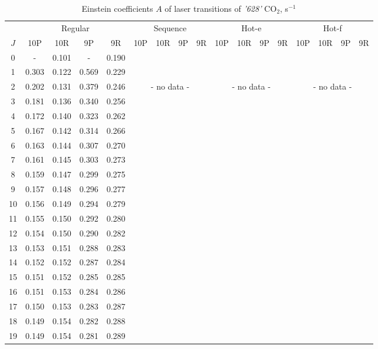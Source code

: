 \documentclass{report}
\begin{document}
\begin{table}
\centering
\caption{Einstein coefficients $A$ of laser transitions of \textit{'628'} CO$_2$, s$^{-1}$}
\scriptsize
\begin{tabular}{|c|cccc|cccc|cccc|cccc|}
\hline
& \multicolumn{4}{c|}{Regular}& \multicolumn{4}{c|}{Sequence}& \multicolumn{4}{c|}{Hot-e}& \multicolumn{4}{c|}{Hot-f}\\
$J$ & 10P & 10R & 9P & 9R & 10P & 10R & 9P & 9R & 10P & 10R & 9P & 9R & 10P & 10R & 9P & 9R\\ 
\hline
0  &   -   & 0.101 &   -   & 0.190 & & & & & & & & & & & &\\
1  & 0.303 & 0.122 & 0.569 & 0.229 & & & & & & & & & & & &\\
2  & 0.202 & 0.131 & 0.379 & 0.246 & \multicolumn{4}{c|}{- no data -}& \multicolumn{4}{c|}{- no data -}& \multicolumn{4}{c|}{- no data -}\\
3  & 0.181 & 0.136 & 0.340 & 0.256 & & & & & & & & & & & &\\
4  & 0.172 & 0.140 & 0.323 & 0.262 & & & & & & & & & & & &\\
5  & 0.167 & 0.142 & 0.314 & 0.266 & & & & & & & & & & & &\\
6  & 0.163 & 0.144 & 0.307 & 0.270 & & & & & & & & & & & &\\
7  & 0.161 & 0.145 & 0.303 & 0.273 & & & & & & & & & & & &\\
8  & 0.159 & 0.147 & 0.299 & 0.275 & & & & & & & & & & & &\\
9  & 0.157 & 0.148 & 0.296 & 0.277 & & & & & & & & & & & &\\
10 & 0.156 & 0.149 & 0.294 & 0.279 & & & & & & & & & & & &\\
11 & 0.155 & 0.150 & 0.292 & 0.280 & & & & & & & & & & & &\\
12 & 0.154 & 0.150 & 0.290 & 0.282 & & & & & & & & & & & &\\
13 & 0.153 & 0.151 & 0.288 & 0.283 & & & & & & & & & & & &\\
14 & 0.152 & 0.152 & 0.287 & 0.284 & & & & & & & & & & & &\\
15 & 0.151 & 0.152 & 0.285 & 0.285 & & & & & & & & & & & &\\
16 & 0.151 & 0.153 & 0.284 & 0.286 & & & & & & & & & & & &\\
17 & 0.150 & 0.153 & 0.283 & 0.287 & & & & & & & & & & & &\\
18 & 0.149 & 0.154 & 0.282 & 0.288 & & & & & & & & & & & &\\
19 & 0.149 & 0.154 & 0.281 & 0.289 & & & & & & & & & & & &\\

\end{tabular}
\end{table}
\end{document}
